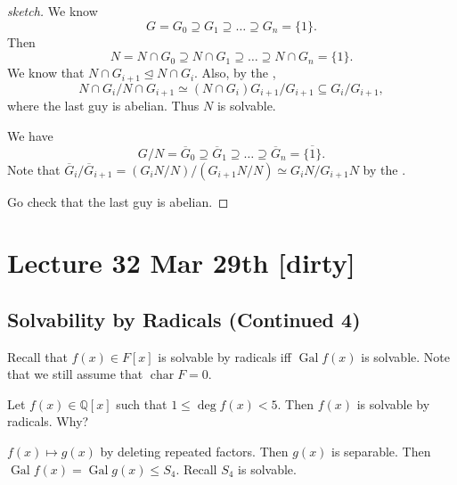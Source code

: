 \documentclass[notoc,notitlepage,nobib]{tufte-book}
\DeclareMathOperator{\Gal}{Gal}
\DeclareMathOperator{\Char}{char}
\begin{document}
\begin{proof}[sketch]
  We know
  \begin{equation*}
    G = G_0 \supseteq G_1 \supseteq \hdots \supseteq G_n =\{1\}.
  \end{equation*}
  Then
  \begin{equation*}
    N = N \cap G_0 \supseteq N \cap G_1 \supseteq \hdots \supseteq N \cap G_n =
    \{ 1 \}.
  \end{equation*}
  We know that $N \cap G_{i+1} \trianglelefteq N \cap G_i$. Also, by the
   ,
  \begin{equation*}
    N \cap G_i / N \cap G_{i+1} \simeq (N \cap G_i) G_{i+1} / G_{i+1} \subseteq
    G_i / G_{i+1},
  \end{equation*}
  where the last guy is abelian. Thus $N$ is solvable.

  We have
  \begin{equation*}
    G / N = \overline{G}_0 \supseteq \overline{G}_1 \supseteq \hdots
    \supseteq \overline{G}_n = \overline{\{1\}}.
  \end{equation*}
  Note that $\overline{G}_i / \overline{G}_{i+1} = \left( G_i N / N \right) /
  \left( G_{i+1} N / N \right) \simeq G_i N / G_{i+1} N$ by the .

  Go check that the last guy is abelian.
\end{proof}




\chapter{Lecture 32 Mar 29th [dirty]}%
\label{chp:lecture_32_mar_29th}

\section{Solvability by Radicals (Continued 4)}%
\label{sec:solvability_by_radicals_continued_4}

Recall that $f(x) \in F[x]$ is solvable by radicals iff $\Gal f(x)$ is solvable.
Note that we still assume that $\Char F = 0$.

\begin{eg}
  Let $f(x) \in \mathbb{Q}[x]$ such that $1 \leq \deg f(x) < 5$. Then $f(x)$ is
  solvable by radicals. Why?

  $f(x) \mapsto g(x)$ by deleting repeated factors. Then $g(x)$ is separable.
  Then $\Gal f(x) = \Gal g(x) \leq S_4$. Recall $S_4$ is solvable.
\end{eg}
\end{document}
